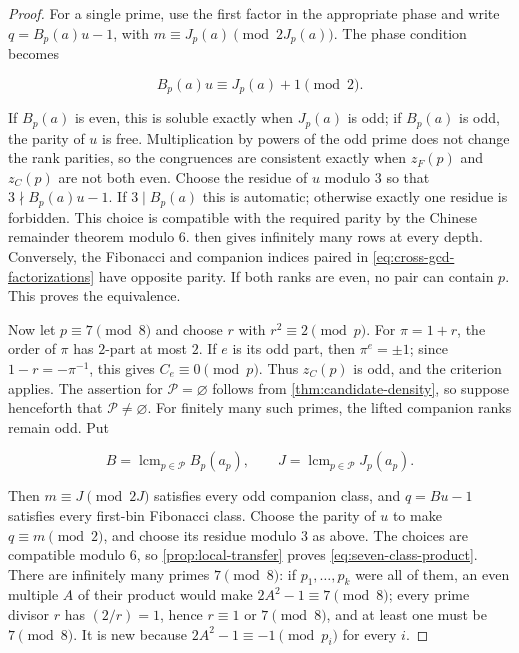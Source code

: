 \begin{proof}
For a single prime, use the first factor in the appropriate phase and write
$q=B_p(a)u-1$, with
$m\equiv J_p(a)\pmod {2J_p(a)}$. The phase condition becomes

\begin{equation}
 B_p(a)u\equiv J_p(a)+1\pmod2.
\end{equation}

If $B_p(a)$ is even, this is soluble exactly when $J_p(a)$ is odd; if
$B_p(a)$ is odd, the parity of $u$ is free. Multiplication by powers of the
odd prime does not change the rank parities, so the congruences are
consistent exactly when $z_F(p)$ and $z_C(p)$ are not both even. Choose the
residue of $u$ modulo $3$ so that $3\nmid B_p(a)u-1$. If
$3\mid B_p(a)$ this is automatic; otherwise exactly one residue is
forbidden. This choice is compatible with the required parity by the Chinese
remainder theorem modulo $6$.
 then gives infinitely many rows at every depth.
Conversely, the Fibonacci and companion indices paired in
\cref{eq:cross-gcd-factorizations} have opposite parity. If both ranks are
even, no pair can contain $p$. This proves the equivalence.

Now let $p\equiv7\pmod8$ and choose $r$ with $r^2\equiv2\pmod p$. For
$\pi=1+r$, the order of $\pi$ has $2$-part at most $2$. If $e$ is its odd
part, then $\pi^e=\pm1$; since $1-r=-\pi^{-1}$, this gives
$C_e\equiv0\pmod p$. Thus $z_C(p)$ is odd, and the criterion applies.
The assertion for $\mathcal P=\varnothing$ follows from
\cref{thm:candidate-density}, so suppose henceforth that
$\mathcal P\ne\varnothing$.
For finitely many such primes, the lifted companion ranks remain odd. Put

\[
 B=\operatorname{lcm}_{p\in\mathcal P}B_p(a_p),
 \qquad
 J=\operatorname{lcm}_{p\in\mathcal P}J_p(a_p).
\]

Then $m\equiv J\pmod {2J}$ satisfies every odd companion class, and
$q=Bu-1$ satisfies every first-bin Fibonacci class. Choose the parity of
$u$ to make $q\equiv m\pmod2$, and choose its residue modulo $3$ as above.
The choices are compatible modulo $6$, so \cref{prop:local-transfer} proves
\cref{eq:seven-class-product}. There are
infinitely many primes $7\pmod8$: if $p_1,\ldots,p_k$ were all of them,
an even multiple $A$ of their product would make $2A^2-1\equiv7\pmod8$;
every prime divisor $r$ has $(2/r)=1$, hence
$r\equiv1$ or $7\pmod8$, and at least one must be $7\pmod8$. It is new
because $2A^2-1\equiv-1\pmod {p_i}$ for every $i$.


\end{proof}
